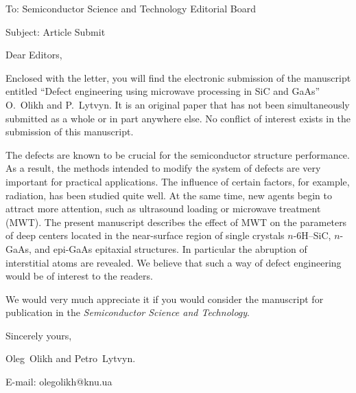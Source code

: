 \documentclass[preprint]{elsarticle}
\begin{document}
To:
Semiconductor Science and Technology Editorial Board


Subject:
Article Submit

\vspace{5mm}
Dear Editors,

\vspace{3mm}
Enclosed with the letter, you will find the electronic submission of the manuscript entitled
``Defect engineering using microwave processing in SiC and GaAs'' O.~Olikh  and P.~Lytvyn.
It is an original paper that has not been simultaneously submitted as a whole or in part anywhere else.
No conflict of interest exists in the submission of this manuscript.


The defects are known to be crucial for the semiconductor structure performance.
As a result, the methods intended to modify the system of defects are very important for practical applications.
The influence of certain factors, for example, radiation, has been studied quite well.
At the same time, new agents begin to attract more attention, such as ultrasound loading
or microwave treatment (MWT).
The present manuscript describes the effect of MWT on the parameters of deep centers located in the near-surface region
of single crystals $n$-6H–SiC, $n$-GaAs, and epi-GaAs epitaxial structures.
In particular the abruption of interstitial atoms are revealed.
We believe that such a way of defect engineering would be of interest to the readers.

We would  very much appreciate it if you would consider the manuscript for publication in the \emph{Semiconductor Science and Technology}.

\vspace{3mm}

Sincerely yours,

Oleg~Olikh and Petro~Lytvyn.

E-mail: olegolikh@knu.ua


\end{document}
